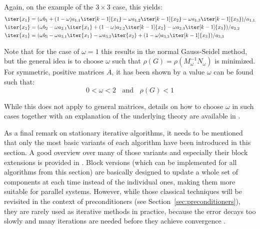 \noindent Again, on the example of the $3 \times 3$ case, this yields:
\begin{equation}
\label{eqn:sor}
   \begin{aligned}
    \iter{x_1} & =  (\omega b_1 +(1-\omega)a_{1,1}\iter[k-1]{x_1} -\omega a_{1,2}\iter[k-1]{x_2} - \omega a_{1,3}\iter[k-1]{x_3})/a_{1,1} \\
    \iter{x_2} & =  (\omega b_2 -\omega a_{2,1}\iter{x_1} +(1-\omega) a_{2,2}\iter[k-1]{x_2} - \omega a_{2,3}\iter[k-1]{x_3})/a_{2,2} \\
    \iter{x_3} & =  (\omega b_3 -\omega a_{3,1}\iter{x_1} -\omega a_{3,2}\iter{x_2} + (1-\omega) a_{3,3}\iter[k-1]{x_3})/a_{3,3} \\
\end{aligned} 
\end{equation}

\noindent Note that for the case of $\omega = 1$ this results in the normal Gauss-Seidel method, but the general idea is to choose $\omega$ such that $\rho(G)=\rho(M^{-1}_\omega N_\omega)$ is minimized. For symmetric, positive matrices $A$, it has been shown by \cite{young_convergence_1970} a value $\omega$ can be found such that:
\begin{equation}
       0<\omega<2 \;\;\text{ and }\;\; \rho(G)<1
\end{equation}

\noindent While this does not apply to general matrices, details on how to choose $\omega$ in such cases together with an explanation of the underlying theory are available in \cite{greenbaum_iterative_1997}.

As a final remark on stationary iterative algorithms, it needs to be mentioned that only the most basic variants of each algorithm have been introduced in this section. A good overview over many of those variants and especially their block extensions is provided in \cite{saad_iterative_2003}. Block versions (which can be implemented for all algorithms from this section) are basically designed to update a whole set of components at each time instead of the individual ones, making them more suitable for parallel systems. However, while those classical techniques will be revisited in the context of preconditioners (see Section~\hyperref[sec:preconditioners]{\ref{sec:preconditioners}}), they are rarely used as iterative methods in practice, because the error decays too slowly and many iterations are needed before they achieve convergence \cite{strang_introduction_2009}.




